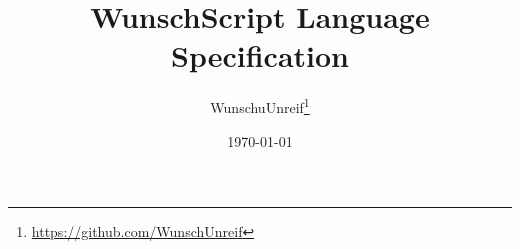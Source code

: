 \usepackage{url}
\usepackage{hyperref}
\usepackage{fancyhdr}
\usepackage{minted}

\newcommand{\WS}{{\sc WunschScript }}

\title{\WS Language Specification}
\author{WunschuUnreif\thanks{\url{https://github.com/WunschUnreif}}}
\date{\today}


\pagestyle{fancy}
